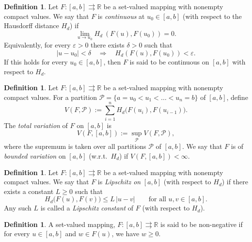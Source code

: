 \documentclass[a4paper,12pt,reqno]{amsart}
\numberwithin{equation}{section}
\theoremstyle{definition}
\newtheorem{definition}[theorem]{Definition}
\theoremstyle{remark}
\numberwithin{equation}{section}
\begin{document}
\begin{definition}
    Let $F:[a,b]\rightrightarrows\mathbb{R}$ be a set-valued mapping with nonempty
compact values. We say that $F$ is \emph{continuous} at $u_0\in[a,b]$ 
(with respect to the Hausdorff distance $H_d$) if 
\[
\lim_{u\to u_0} H_d\ \left(F(u),F(u_0)\right)=0.
\]
Equivalently, for every $\varepsilon>0$ there exists $\delta>0$ such that
\[
|u-u_0|<\delta
\quad \Longrightarrow \quad
H_d\!\left(F(u),F(u_0)\right)<\varepsilon .
\]
If this holds for every $u_0\in[a,b]$, then $F$ is said to be continuous on $[a,b]$ with respect to $H_d$.
\end{definition}
\begin{definition}
Let $F:[a,b]\rightrightarrows\mathbb{R}$ be a set-valued mapping with 
nonempty compact values. For a partition 
$\mathcal{P}=\{a=u_0<u_1<\dots<u_n=b\}$ of $[a,b]$, define
\[
V(F,\mathcal{P})
:=
\sum_{i=1}^{n} H_d\big(F(u_i),F(u_{i-1})\big).
\]
The \emph{total variation} of $F$ on $[a,b]$ is
\[
V(F,[a,b])
:=
\sup_{\mathcal{P}} V(F,\mathcal{P}),
\]
where the supremum is taken over all partitions $\mathcal{P}$ of $[a,b]$.
We say that $F$ is of \emph{bounded variation} on $[a,b]$ 
(w.r.t.\ $H_d$) if $V(F,[a,b])<\infty$.
\end{definition}
\begin{definition}
Let $F:[a,b]\rightrightarrows\mathbb{R}$ be a set-valued mapping with 
nonempty compact values. We say that $F$ is \emph{Lipschitz on} $[a,b]$ 
(with respect to $H_d$) if there exists a constant $L\ge 0$ such that
\[
H_d\big(F(u),F(v)\big)
\le L\,|u-v|
\qquad\text{for all }u,v\in[a,b].
\]
Any such $L$ is called a \emph{Lipschitz constant} of $F$ (with respect 
to $H_d$).
\end{definition}
\begin{definition}
A set-valued mapping, $F:[a,b]\rightrightarrows \mathbb{R}$ is said to be non-negative if for every $u\in [a,b]$ and $w\in F(u)$, we have $w\geq 0.$
\end{definition}
\end{document}
